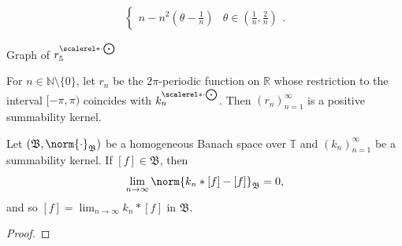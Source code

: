\documentclass[notoc,notitlepage]{tufte-book}
\DeclareMathOperator*{\bigcdot}{\scalerel*{\cdot}{\bigodot}}
\begin{document}
\begin{eg}
\begin{enumerate}
\begin{align*}
\begin{cases}
          n - n^2 \left( \theta - \frac{1}{n} \right) & \theta \in \left( \frac{1}{n}, \frac{2}{n} \right)
        \end{cases}.
      \end{align*}
      \begin{marginfigure}
        \centering
        \caption{Graph of $r_5^{\bigcdot}$}\label{fig:graph_of_r_5_bigcdot_}
      \end{marginfigure}
      For $n \in \mathbb{N} \setminus \{ 0 \}$, let $r_n$ be the
      $2\pi$-periodic function on $\mathbb{R}$ whose restriction
      to the interval $[-\pi, \pi)$ coincides with $k_n^{\bigcdot}$.
      Then $(r_n)_{n=1}^{\infty}$ is a positive summability kernel.
  \end{enumerate}
\end{eg}

\begin{thm}\label{thm:summability_kernels_convolved_with_functions_in_homogeneous_banach_spaces}
  Let $(\mathfrak{B}, \norm{\cdot}_{\mathfrak{B}})$ be
  a homogeneous Banach space over $\mathbb{T}$ and
  $(k_n)_{n=1}^{\infty}$ be a summability kernel.
  If $[f] \in \mathfrak{B}$, then
  \begin{equation*}
    \lim_{n \to \infty} \norm{ k_n * [f] - [f] }_{\mathfrak{B}} = 0,
  \end{equation*}
  and so $[f] = \lim_{n \to \infty} k_n * [f]$ in $\mathfrak{B}$.
\end{thm}

\begin{proof}
\end{proof}
\end{document}
